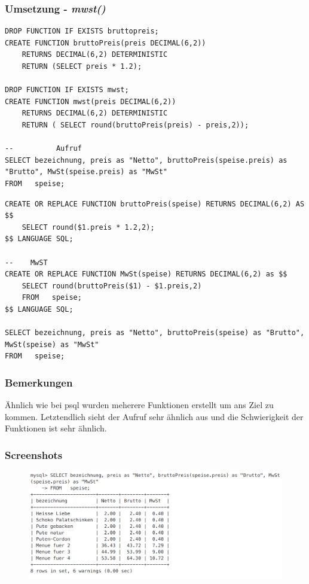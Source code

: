 \subsubsection{Umsetzung - \textit{mwst()}}
\vspace{0.3cm}
\begin{minipage}{.5\textwidth}
	\begin{lstlisting}[style=sql1, caption={mwst() - MySQL}]
DROP FUNCTION IF EXISTS bruttopreis;
CREATE FUNCTION bruttoPreis(preis DECIMAL(6,2))
	RETURNS DECIMAL(6,2) DETERMINISTIC
	RETURN (SELECT preis * 1.2);

DROP FUNCTION IF EXISTS mwst;
CREATE FUNCTION mwst(preis DECIMAL(6,2))
	RETURNS DECIMAL(6,2) DETERMINISTIC
	RETURN ( SELECT round(bruttoPreis(preis) - preis,2));

-- 			Aufruf
SELECT bezeichnung, preis as "Netto", bruttoPreis(speise.preis) as "Brutto", MwSt(speise.preis) as "MwSt"
FROM   speise;
	\end{lstlisting}
\end{minipage}%
\begin{minipage}{.5\textwidth}
	\begin{lstlisting}[style=sql, caption={mwst() - PSQL}]
CREATE OR REPLACE FUNCTION bruttoPreis(speise) RETURNS DECIMAL(6,2) AS $$
	SELECT round($1.preis * 1.2,2);
$$ LANGUAGE SQL;

--    MwST
CREATE OR REPLACE FUNCTION MwSt(speise) RETURNS DECIMAL(6,2) as $$
	SELECT round(bruttoPreis($1) - $1.preis,2)
	FROM   speise;
$$ LANGUAGE SQL;

SELECT bezeichnung, preis as "Netto", bruttoPreis(speise) as "Brutto", MwSt(speise) as "MwSt"
FROM   speise;
	\end{lstlisting}
\end{minipage}

\subsubsection{Bemerkungen}
Ähnlich wie bei psql wurden meherere Funktionen erstellt um ans Ziel zu kommen.
Letztendlich sieht der Aufruf sehr ähnlich aus und die Schwierigkeit der Funktionen ist sehr ähnlich.

\subsubsection{Screenshots}
	\begin{figure}[!h]
		\begin{center}
			\includegraphics[width=0.65\linewidth]{images/s07.png}
		\end{center}
	\end{figure}

